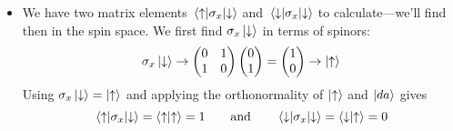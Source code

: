 \documentclass[11pt, a4paper]{article}
\newcommand{\eqtext}[1]{\qquad \text{#1} \qquad}
\newcommand{\ua}{\uparrow}  %
\newcommand{\da}{\downarrow}  %
\begin{document}
\begin{itemize}
	\item We have two matrix elements $ \mel{\ua}{\sigma_{x}}{\da} $ and $ \mel{\da}{\sigma_{x}}{\da} $ to calculate---we'll find then in the spin space. We first find $ \sigma_{x}\ket{\da} $ in terms of spinors:
	\begin{equation*}
		\sigma_{x}\ket{\da} \to 
		\begin{pmatrix}
		0 & 1\\
		1 & 0
		\end{pmatrix}
		\begin{pmatrix}
		0\\
		1
		\end{pmatrix}
		= 
		\begin{pmatrix}
		1\\
		0
		\end{pmatrix}
		\to \ket{\ua}
	\end{equation*}
	Using  $ \sigma_{x}\ket{\da} = \ket{\ua} $ and applying the orthonormality of $ \ket{\ua} $ and $ \ket{da} $ gives
	\begin{equation*}
		\mel{\ua}{\sigma_{x}}{\da} = \braket{\ua}{\ua} = 1 \eqtext{and} \mel{\da}{\sigma_{x}}{\da} = \braket{\da}{\ua} = 0
	\end{equation*}
	

\end{itemize}
\end{document}
